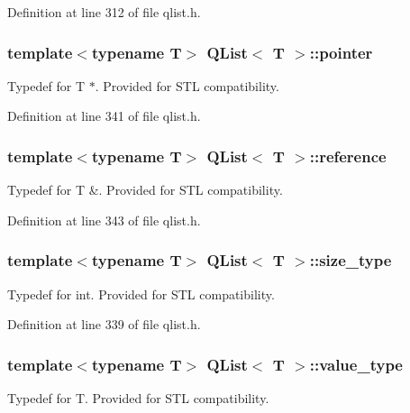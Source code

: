 Definition at line 312 of file qlist.\+h.

\subsubsection[{\texorpdfstring{pointer}{pointer}}]{\setlength{\rightskip}{0pt plus 5cm}template$<$typename T$>$ {\bf Q\+List}$<$ T $>$\+::{\bf pointer}}\hypertarget{class_q_list_ad81e368aee3084fe5ddc056fa649a4ac}{}\label{class_q_list_ad81e368aee3084fe5ddc056fa649a4ac}
Typedef for T $\ast$. Provided for S\+TL compatibility. 

Definition at line 341 of file qlist.\+h.

\subsubsection[{\texorpdfstring{reference}{reference}}]{\setlength{\rightskip}{0pt plus 5cm}template$<$typename T$>$ {\bf Q\+List}$<$ T $>$\+::{\bf reference}}\hypertarget{class_q_list_adc9961317867d5844c90efac09c09bfb}{}\label{class_q_list_adc9961317867d5844c90efac09c09bfb}
Typedef for T \&. Provided for S\+TL compatibility. 

Definition at line 343 of file qlist.\+h.

\subsubsection[{\texorpdfstring{size\+\_\+type}{size_type}}]{\setlength{\rightskip}{0pt plus 5cm}template$<$typename T$>$ {\bf Q\+List}$<$ T $>$\+::{\bf size\+\_\+type}}\hypertarget{class_q_list_a5b78b75651f6641fe9339b050508aa6f}{}\label{class_q_list_a5b78b75651f6641fe9339b050508aa6f}
Typedef for int. Provided for S\+TL compatibility. 

Definition at line 339 of file qlist.\+h.

\subsubsection[{\texorpdfstring{value\+\_\+type}{value_type}}]{\setlength{\rightskip}{0pt plus 5cm}template$<$typename T$>$ {\bf Q\+List}$<$ T $>$\+::{\bf value\+\_\+type}}\hypertarget{class_q_list_a5c685421300b8a855730c9b06ff43605}{}\label{class_q_list_a5c685421300b8a855730c9b06ff43605}
Typedef for T. Provided for S\+TL compatibility. 

